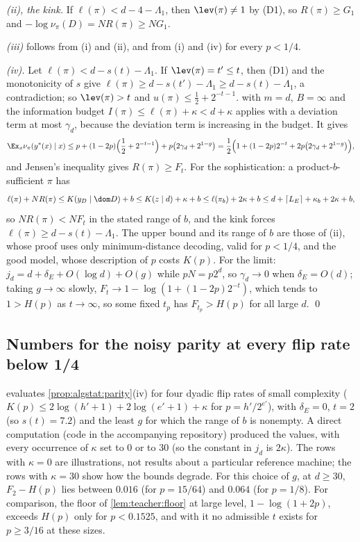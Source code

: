 \emph{(ii), the kink.} If $\ell(\pi)<d-4-\Lambda_1$, then $\lev(\pi)\ne1$ by (D1), so $R(\pi)\ge G_1$ and $-\log\nu_\pi(D)=NR(\pi)\ge NG_1$.

\emph{(iii)} follows from (i) and (ii), and from (i) and (iv) for every $p<1/4$.

\emph{(iv).} Let $\ell(\pi)<d-s(t)-\Lambda_1$. If $\lev(\pi)=t'\le t$, then (D1) and the monotonicity of $s$ give $\ell(\pi)\ge d-s(t')-\Lambda_1\ge d-s(t)-\Lambda_1$, a contradiction; so $\lev(\pi)>t$ and $u(\pi)\le\frac12+2^{-t-1}$.  with $m=d$, $B=\infty$ and the information budget $I(\pi)\le\ell(\pi)+\kappa<d+\kappa$ applies with a deviation term at most $\gamma_d$, because the deviation term is increasing in the budget. It gives
\[
\Ex_x\nu_\pi(y^*(x)\mid x)\le p+(1-2p)\Big(\frac12+2^{-t-1}\Big)+p\big(2\gamma_d+2^{1-g}\big)=\frac12\Big(1+(1-2p)2^{-t}+2p\big(2\gamma_d+2^{1-g}\big)\Big),
\]
and Jensen's inequality gives $R(\pi)\ge F_t$. For the sophistication: a product-$b$-sufficient $\pi$ has
\[
\ell(\pi)+NR(\pi)\le K(y_D\mid\dom D)+b\le K(z\mid d)+\kappa+b\le\ell(\pi_b)+2\kappa+b\le d+\lceil L_E\rceil+\kappa_b+2\kappa+b,
\]
so $NR(\pi)<NF_t$ in the stated range of $b$, and the kink forces $\ell(\pi)\ge d-s(t)-\Lambda_1$. The upper bound and its range of $b$ are those of (ii), whose proof uses only minimum-distance decoding, valid for $p<1/4$, and the good model, whose description of $p$ costs $K(p)$. For the limit: $j_d=d+\delta_E+O(\log d)+O(g)$ while $pN=p2^d$, so $\gamma_d\to0$ when $\delta_E=O(d)$; taking $g\to\infty$ slowly, $F_t\to1-\log(1+(1-2p)2^{-t})$, which tends to $1>H(p)$ as $t\to\infty$, so some fixed $t_p$ has $F_{t_p}>H(p)$ for all large $d$. \qed

\subsection{Numbers for the noisy parity at every flip rate below 1/4}\label{app:algstat:numbers}

 evaluates \cref{prop:algstat:parity}(iv) for four dyadic flip rates of small complexity ($K(p)\le2\log(h'+1)+2\log(e'+1)+\kappa$ for $p=h'/2^{e'}$), with $\delta_E=0$, $t=2$ (so $s(t)=7.2$) and the least $g$ for which the range of $b$ is nonempty. A direct computation (code in the accompanying repository) produced the values, with every occurrence of $\kappa$ set to $0$ or to $30$ (so the constant in $j_d$ is $2\kappa$). The rows with $\kappa=0$ are illustrations, not results about a particular reference machine; the rows with $\kappa=30$ show how the bounds degrade. For this choice of $g$, at $d\ge30$, $F_2-H(p)$ lies between $0.016$ (for $p=15/64$) and $0.064$ (for $p=1/8$). For comparison, the floor of \cref{lem:teacher:floor} at large level, $1-\log(1+2p)$, exceeds $H(p)$ only for $p<0.1525$, and with it no admissible $t$ exists for $p\ge3/16$ at these sizes.

